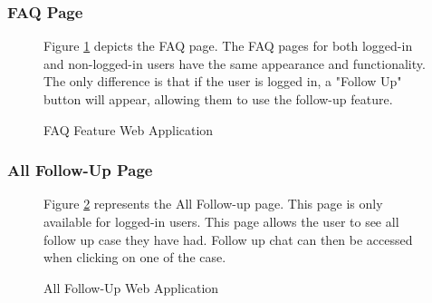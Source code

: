 \documentclass[12pt,oneside,openright,a4paper]{cpe-english-project}
\begin{document}
        \subsubsection{FAQ Page}
          \begin{figure}[H]
            \centering
            \caption{FAQ Feature Web Application}\label{fig:WebAppFAQ}
            \begin{justify}
              \qquad Figure \ref{fig:WebAppFAQ} depicts the FAQ page. The FAQ pages for both logged-in and non-logged-in users have the same appearance and functionality. The only difference is that if the user is logged in, a "Follow Up" button will appear, allowing them to use the follow-up feature.\par
            \end{justify}        
          \end{figure}
        \subsubsection{All Follow-Up Page}
          \begin{figure}[H]
            \centering
            \caption{All Follow-Up Web Application}\label{fig:WebAppAllFollowUp}
            \begin{justify}
              \qquad Figure \ref{fig:WebAppAllFollowUp} represents the All Follow-up page. This page is only available for logged-in users. This page allows the user to see all follow up case they have had. Follow up chat can then be accessed when clicking on one of the case.\par
            \end{justify}        
          \end{figure}
\end{document}
